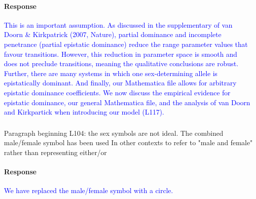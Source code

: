 \documentclass[10pt,letterpaper]{article}
\begin{document}
\noindent\paragraph{Response}
\textcolor{blue}{
This is an important assumption.
As discussed in the supplementary of van Doorn \& Kirkpatrick (2007, Nature), partial dominance and incomplete penetrance (partial epistatic dominance) reduce the range parameter values that favour transitions.
However, this reduction in parameter space is smooth and does not preclude transitions, meaning the qualitative conclusions are robust.
Further, there are many systems in which one sex-determining allele is epistatically dominant.
And finally, our Mathematica file allows for arbitrary epistatic dominance coefficients.
We now discuss the empirical evidence for epistatic dominance, our general Mathematica file, and the analysis of van Doorn and Kirkpartick when introducing our model (L117).
}
%

\noindent\subsubsection{}
Paragraph beginning L104: the sex symbols are not ideal. The combined male/female symbol has been used In other contexts to refer to "male and female" rather than representing either/or

\noindent\paragraph{Response}
\textcolor{blue}{We have replaced the male/female symbol with a circle.}
\end{document}
